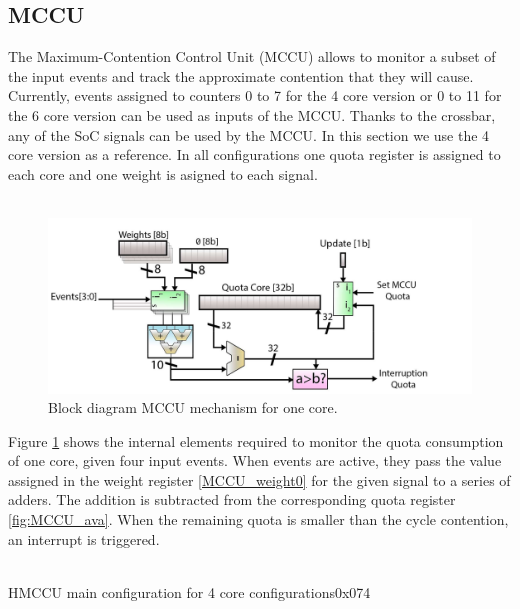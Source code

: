 \subsection{MCCU}
The Maximum-Contention Control Unit (MCCU) allows to monitor a subset of the input events and track the approximate contention that they will cause. Currently, events assigned to counters 0 to 7 for the 4 core version or 0 to 11 for the 6 core version can be used as inputs of the MCCU.  Thanks to the crossbar, any of the SoC signals can be used by the MCCU. In this section we use the 4 core version as a reference. In all configurations one quota register is assigned to each core and one weight is asigned to each signal.\\
\\
\begin{figure}[H]
	\includegraphics[keepaspectratio,width=\columnwidth]{img/bd_MCCU.png}
	\caption{Block diagram MCCU mechanism for one core.}
	\label{fig:blk_MCCU}
\end{figure}
Figure \ref{fig:blk_MCCU} shows the internal elements required to monitor the quota consumption of one core, given four input events.  When events are active, they pass the value assigned in the weight register \ref{MCCU_weight0} for the given signal to a series of adders. The addition is subtracted from the corresponding quota register \ref{fig:MCCU_ava}. When the remaining quota is smaller than the cycle contention, an interrupt is triggered.\\
\\
\begin{register}{H}{MCCU main configuration for 4 core configurations}{0x074}
	\label{MCCU_cfg}
	\regnewline
\end{register}
